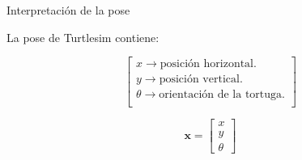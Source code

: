 \documentclass[aspectratio=169]{beamer}
\begin{document}
\begin{frame}{Interpretación de la pose}

    La pose de Turtlesim contiene:

    \[
    \begin{bmatrix}
        x \rightarrow \text{posición horizontal.} \\

        y \rightarrow \text{posición vertical.} \\


        \theta \rightarrow \text{orientación de la tortuga.}\\

    \end{bmatrix}
    \]

    \[
    \mathbf{x}
    =
    \begin{bmatrix}
        x\\
        y\\
        \theta
    \end{bmatrix}
    \]

    \vspace{-0.3cm}


\end{frame}
\end{document}
